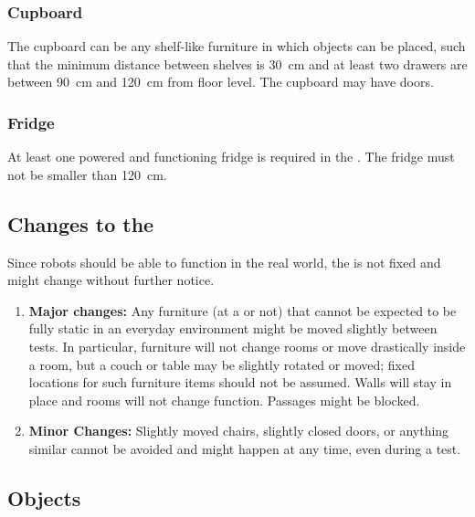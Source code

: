 \subsubsection{Cupboard}

The cupboard can be any shelf-like furniture in which objects can be placed, such that the minimum distance between shelves is \SI{30}{\centi\meter} and at least two drawers are between \SI{90}{\centi\meter} and \SI{120}{\centi\meter} from floor level.
The cupboard may have doors.

\subsubsection{Fridge}

At least one powered and functioning fridge is required in the \Arena.
The fridge must not be smaller than \SI{120}{\centi\meter}.

\subsection{Changes to the \Arena}
\label{rule:scenario_changes}

Since robots should be able to function in the real world, the \Arena{} is not fixed and might change without further notice.
\begin{enumerate}
	\item \textbf{Major changes:}
	Any furniture (at a \PredefinedLocation{} or not) that cannot be expected to be fully static in an everyday environment might be moved slightly between tests.
	In particular, furniture will not change rooms or move drastically inside a room, but a couch or table may be slightly rotated or moved; fixed locations for such furniture items should not be assumed.
	Walls will stay in place and rooms will not change function.
	Passages might be blocked.
	\item \textbf{Minor Changes:} Slightly moved chairs, slightly closed doors, or anything similar cannot be avoided and might happen at any time, even during a test.
\end{enumerate}


%
%
%
\def\NumObjects{30\ }
\def\NumLocations{20\ }
\def\NumNames{20\ }

\subsection{Objects}
\label{rule:scenario_objects}

